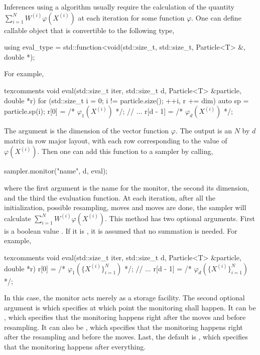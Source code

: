 Inferences using a \smc algorithm usually require the calculation of the
quantity $\sum_{i=1}^NW^{(i)}\varphi(X^{(i)})$ at each iteration for some
function $\varphi$. One can define callable object that is convertible to the
following type,
\begin{cppcode}
  using eval_type =
      std::function<void(std::size_t, std::size_t, Particle<T> &, double *);
\end{cppcode}
For example,
\begin{cppcode*}{texcomments}
  void eval(std::size_t iter, std::size_t d, Particle<T> &particle, double *r)
  {
      for (std::size_t i = 0; i != particle.size(); ++i, r += dim) {
          auto sp = particle.sp(i);
          r[0] = /* $\varphi_1(X^{(i)})$ */;
          // ...
          r[d - 1] = /* $\varphi_d(X^{(i)})$ */;
      }
  }
\end{cppcode*}
The argument  is the dimension of the vector function $\varphi$.
The output is an $N$ by $d$ matrix in row major layout, with each row
corresponding to the value of $\varphi(X^{(i)})$. Then one can add this
function to a sampler by calling,
\begin{cppcode}
  sampler.monitor("name", d, eval);
\end{cppcode}
where the first argument is the name for the monitor, the second its dimension,
and the third the evaluation function. At each iteration, after all the
initialization, possible resampling, moves and \mcmc moves are done, the
sampler will calculate $\sum_{i=1}^NW^{(i)}\varphi(X^{(i)})$. This method has
two optional arguments. First is a boolean value . If it
is , it is assumed that no summation is needed. For example,
\begin{cppcode*}{texcomments}
  void eval(std::size_t iter, std::size_t d, Particle<T> &particle, double *r)
  {
      r[0] = /* $\varphi_1(\{X^{(i)}\}_{i=1}^N)$ */;
      // ...
      r[d - 1] = /* $\varphi_d(\{X^{(i)}\}_{i=1}^N)$ */;
  }
\end{cppcode*}
In this case, the monitor acts merely as a storage facility. The second
optional argument is  which specifies at which point the
monitoring shall happen. It can be , which specifies
that the monitoring happens right after the moves and before resampling. It can
also be , which specifies that the monitoring
happens right after the resampling and before the \mcmc moves. Last, the
default is , which specifies that the monitoring happens
after everything.

